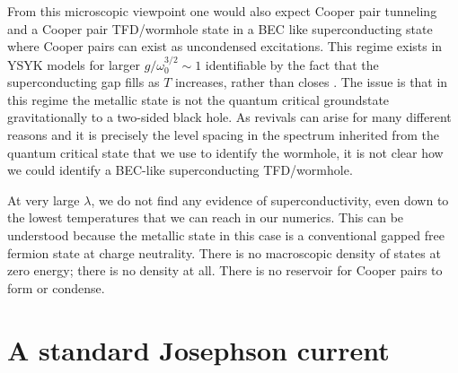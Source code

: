 From this microscopic viewpoint one would also expect Cooper pair tunneling and a Cooper pair TFD/wormhole state in a BEC like superconducting state where Cooper pairs can exist as uncondensed excitations. This regime exists in YSYK models for larger $g/\omega_0^{3/2} \sim 1$ identifiable by the fact that the superconducting gap fills as $T$ increases, rather than closes \cite{esterlis2019cooper}. The issue is that in this regime the metallic state is not the quantum critical groundstate gravitationally to a two-sided black hole. As revivals can arise for many different reasons and it is precisely the  level spacing in the spectrum inherited from the quantum critical state that we use to identify the wormhole, it is not clear how we could identify a BEC-like superconducting TFD/wormhole.

%
%


At very large $\lambda$, we do not find any evidence of superconductivity, even down to the lowest temperatures that we can reach in our numerics. This can be understood because the metallic state in this case is a conventional gapped free fermion state at charge neutrality. There is no macroscopic density of states at zero energy; there is no density at all. There is no reservoir for Cooper pairs to form or condense.
%
\newcommand{\eps}{\epsilon}
\section{A standard Josephson current}

